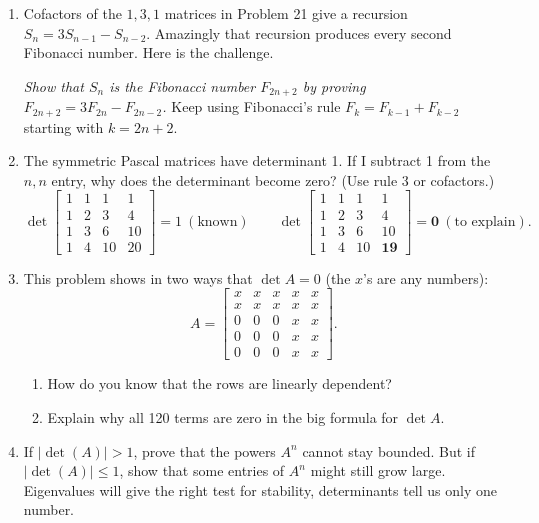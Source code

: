 \documentclass[14pt, a4paper]{article}
\begin{document}
\begin{enumerate}[resume]
    \item Cofactors of the $1, 3, 1$ matrices in Problem 21 give a recursion $S_n = 3S_{n-1} - S_{n-2}$. Amazingly that recursion produces every second Fibonacci number. Here is the challenge.

          \textit{Show that $S_n$ is the Fibonacci number $F_{2n+2}$ by proving $F_{2n+2} = 3F_{2n} - F_{2n-2}$.} Keep using Fibonacci's rule $F_k = F_{k-1} + F_{k-2}$ starting with $k = 2n + 2$.

    \item The symmetric Pascal matrices have determinant 1. If I subtract 1 from the $n, n$ entry, why does the determinant become zero? (Use rule 3 or cofactors.)
          \[
              \det \begin{bmatrix} 1 & 1 & 1 & 1 \\ 1 & 2 & 3 & 4 \\ 1 & 3 & 6 & 10 \\ 1 & 4 & 10 & 20 \end{bmatrix} = 1 \ (\text{known}) \qquad
              \det \begin{bmatrix} 1 & 1 & 1 & 1 \\ 1 & 2 & 3 & 4 \\ 1 & 3 & 6 & 10 \\ 1 & 4 & 10 & \mathbf{19} \end{bmatrix} = \mathbf{0} \ (\text{to explain}).
          \]

    \item This problem shows in two ways that $\det A = 0$ (the $x$'s are any numbers):
          \[
              A = \begin{bmatrix}
                  x & x & x & x & x \\
                  x & x & x & x & x \\
                  0 & 0 & 0 & x & x \\
                  0 & 0 & 0 & x & x \\
                  0 & 0 & 0 & x & x
              \end{bmatrix} .
          \]
          \begin{enumerate}
              \item How do you know that the rows are linearly dependent?
              \item Explain why all 120 terms are zero in the big formula for $\det A$.
          \end{enumerate}

    \item If $|\det(A)| > 1$, prove that the powers $A^n$ cannot stay bounded. But if $|\det(A)| \le 1$, show that some entries of $A^n$ might still grow large. Eigenvalues will give the right test for stability, determinants tell us only one number.
\end{enumerate}
\end{document}
